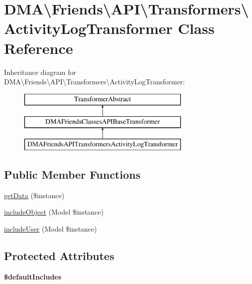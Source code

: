\hypertarget{classDMA_1_1Friends_1_1API_1_1Transformers_1_1ActivityLogTransformer}{}\section{D\+M\+A\textbackslash{}Friends\textbackslash{}A\+P\+I\textbackslash{}Transformers\textbackslash{}Activity\+Log\+Transformer Class Reference}
\label{classDMA_1_1Friends_1_1API_1_1Transformers_1_1ActivityLogTransformer}
Inheritance diagram for D\+M\+A\textbackslash{}Friends\textbackslash{}A\+P\+I\textbackslash{}Transformers\textbackslash{}Activity\+Log\+Transformer\+:\begin{figure}[H]
\begin{center}
\leavevmode
\includegraphics[height=3.000000cm]{dd/dbd/classDMA_1_1Friends_1_1API_1_1Transformers_1_1ActivityLogTransformer}
\end{center}
\end{figure}
\subsection*{Public Member Functions}
\begin{DoxyCompactItemize}
\item 
\hyperlink{classDMA_1_1Friends_1_1API_1_1Transformers_1_1ActivityLogTransformer_ac409b7881bcd7d479b2876ea5fbaa6ed}{get\+Data} (\$instance)
\item 
\hyperlink{classDMA_1_1Friends_1_1API_1_1Transformers_1_1ActivityLogTransformer_a700ebac47dfef9c1327212c904b7bdd4}{include\+Object} (Model \$instance)
\item 
\hyperlink{classDMA_1_1Friends_1_1API_1_1Transformers_1_1ActivityLogTransformer_abe5575182af5af066506991b5e2ab693}{include\+User} (Model \$instance)
\end{DoxyCompactItemize}
\subsection*{Protected Attributes}
\begin{DoxyCompactItemize}
\item 
{\bfseries \$default\+Includes}
\end{DoxyCompactItemize}


